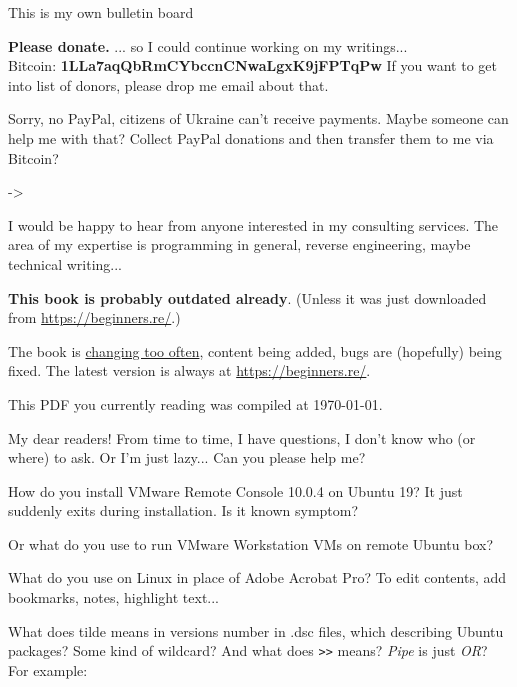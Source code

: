 
\begin{center}
\LARGE{} This is my own bulletin board \normalsize{}
\end{center}

\textbf{Please donate.}
... so I could continue working on my writings...\\
Bitcoin: \textbf{1LLa7aqQbRmCYbccnCNwaLgxK9jFPTqPw}
If you want to get into list of donors, please drop me email about that.

Sorry, no PayPal, citizens of Ukraine can't receive payments.
Maybe someone can help me with that?
Collect PayPal donations and then transfer them to me via Bitcoin?

-> \EMAIL{}

\myhrule{}

I would be happy to hear from anyone interested in my consulting services.
The area of my expertise is programming in general, reverse engineering, maybe technical writing...

\myhrule{}

\textbf{This book is probably outdated already}.
(Unless it was just downloaded from \url{https://beginners.re/}.)

The book is \href{https://github.com/DennisYurichev/RE-for-beginners/commits/master}{changing too often},
content being added, bugs are (hopefully) being fixed.
The latest version is always at \url{https://beginners.re/}.

This PDF you currently reading was compiled at \today{}.

\myhrule{}

My dear readers! From time to time, I have questions, I don't know who (or where) to ask.
Or I'm just lazy...
Can you please help me?

\myhrule{}

How do you install VMware Remote Console 10.0.4 on Ubuntu 19? It just suddenly exits during installation.
Is it known symptom?

Or what do you use to run VMware Workstation VMs on remote Ubuntu box?

\myhrule{}

What do you use on Linux in place of Adobe Acrobat Pro?
To edit contents, add bookmarks, notes, highlight text...

\myhrule{}

What does tilde means in versions number in .dsc files, which describing Ubuntu packages?
Some kind of wildcard?
And what does \verb|>>| means?
\emph{Pipe} is just \emph{OR}?
For example:

